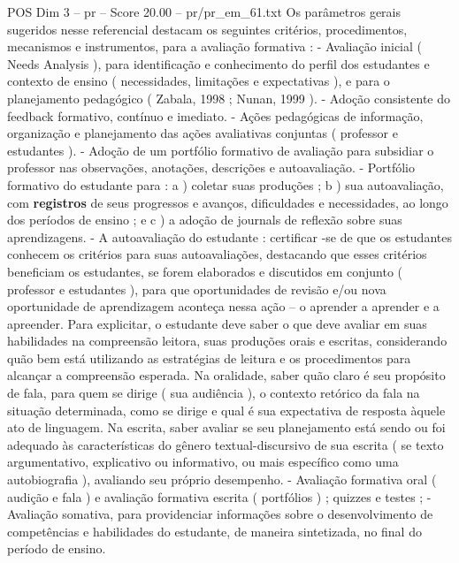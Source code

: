 \begin{textsample}{POS Dim 3 – pr – Score 20.00 – pr/pr\_em\_61.txt}
Os parâmetros gerais sugeridos nesse referencial destacam os seguintes critérios, procedimentos, mecanismos e instrumentos, para a avaliação formativa : - Avaliação inicial ( Needs Analysis ), para identificação e conhecimento do perfil dos estudantes e contexto de ensino ( necessidades, limitações e expectativas ), e para o planejamento pedagógico ( Zabala, 1998 ; Nunan, 1999 ). - Adoção consistente do feedback formativo, contínuo e imediato. - Ações pedagógicas de informação, organização e planejamento das ações avaliativas conjuntas ( professor e estudantes ). - Adoção de um portfólio formativo de avaliação para subsidiar o professor nas observações, anotações, descrições e autoavaliação. - Portfólio formativo do estudante para : a ) coletar suas produções ; b ) sua autoavaliação, com \textbf{registros} de seus progressos e avanços, dificuldades e necessidades, ao longo dos períodos de ensino ; e c ) a adoção de journals de reflexão sobre suas aprendizagens. - A autoavaliação do estudante : certificar -se de que os estudantes conhecem os critérios para suas autoavaliações, destacando que esses critérios beneficiam os estudantes, se forem elaborados e discutidos em conjunto ( professor e estudantes ), para que oportunidades de revisão e/ou nova oportunidade de aprendizagem aconteça nessa ação – o aprender a aprender e a apreender.
Para explicitar, o estudante deve saber o que deve avaliar em suas habilidades na compreensão leitora, suas produções orais e escritas, considerando quão bem está utilizando as estratégias de leitura e os procedimentos para alcançar a compreensão esperada.
Na oralidade, saber quão claro é seu propósito de fala, para quem se dirige ( sua audiência ), o contexto retórico da fala na situação determinada, como se dirige e qual é sua expectativa de resposta àquele ato de linguagem.
Na escrita, saber avaliar se seu planejamento está sendo ou foi adequado às características do gênero textual-discursivo de sua escrita ( se texto argumentativo, explicativo ou informativo, ou mais específico como uma autobiografia ), avaliando seu próprio desempenho. - Avaliação formativa oral ( audição e fala ) e avaliação formativa escrita ( portfólios ) ; quizzes e testes ; - Avaliação somativa, para providenciar informações sobre o desenvolvimento de competências e habilidades do estudante, de maneira sintetizada, no final do período de ensino.

\end{textsample}
